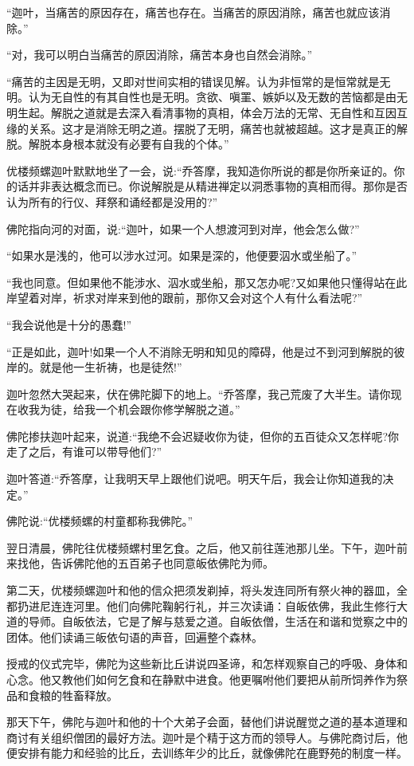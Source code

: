 \documentclass[12pt,twoside,openany]{book}
\begin{document}
“迦叶，当痛苦的原因存在，痛苦也存在。当痛苦的原因消除，痛苦也就应该消除。”

“对，我可以明白当痛苦的原因消除，痛苦本身也自然会消除。”

“痛苦的主因是无明，又即对世间实相的错误见解。认为非恒常的是恒常就是无明。认为无自性的有其自性也是无明。贪欲、嗔罣、嫉妒以及无数的苦恼都是由无明生起。解脱之道就是去深入看清事物的真相，体会万法的无常、无自性和互因互缘的关系。这才是消除无明之道。摆脱了无明，痛苦也就被超越。这才是真正的解脱。解脱本身根本就没有必要有自我的个体。”

优楼频螺迦叶默默地坐了一会，说:“乔答摩，我知造你所说的都是你所亲证的。你的话并非表达概念而已。你说解脱是从精进禅定以洞悉事物的真相而得。那你是否认为所有的行仪、拜祭和诵经都是没用的?”

佛陀指向河的对面，说:“迦叶，如果一个人想渡河到对岸，他会怎么做?”

“如果水是浅的，他可以涉水过河。如果是深的，他便要泅水或坐船了。”

“我也同意。但如果他不能涉水、泅水或坐船，那又怎办呢?又如果他只懂得站在此岸望着对岸，祈求对岸来到他的跟前，那你又会对这个人有什么看法呢?”

“我会说他是十分的愚蠢!”

“正是如此，迦叶!如果一个人不消除无明和知见的障碍，他是过不到河到解脱的彼岸的。就是他一生祈祷，也是徒然!”

迦叶忽然大哭起来，伏在佛陀脚下的地上。“乔答摩，我己荒废了大半生。请你现在收我为徒，给我一个机会跟你修学解脱之道。”

佛陀掺扶迦叶起来，说道:“我绝不会迟疑收你为徒，但你的五百徒众又怎样呢?你走了之后，有谁可以带导他们?”

迦叶答道:“乔答摩，让我明天早上跟他们说吧。明天午后，我会让你知道我的决定。”

佛陀说:“优楼频螺的村童都称我佛陀。”

翌日清晨，佛陀往优楼频螺村里乞食。之后，他又前往莲池那儿坐。下午，迦叶前来找他，告诉佛陀他的五百弟子也同意皈依佛陀为师。

第二天，优楼频螺迦叶和他的信众把须发剃掉，将头发连同所有祭火神的器皿，全都扔进尼连连河里。他们向佛陀鞠躬行礼，并三次读诵：自皈依佛，我此生修行大道的导师。自皈依法，它是了解与慈爱之道。自皈依僧，生活在和谐和觉察之中的团体。他们读诵三皈依句语的声音，回遍整个森林。

授戒的仪式完毕，佛陀为这些新比丘讲说四圣谛，和怎样观察自己的呼吸、身体和心念。他又教他们如何乞食和在静默中进食。他更嘱咐他们要把从前所饲养作为祭品和食粮的牲畜释放。

那天下午，佛陀与迦叶和他的十个大弟子会面，替他们讲说醒觉之道的基本道理和商讨有关组织僧团的最好方法。迦叶是个精于这方而的领导人。与佛陀商讨后，他便安排有能力和经验的比丘，去训练年少的比丘，就像佛陀在鹿野苑的制度一样。
\end{document}
